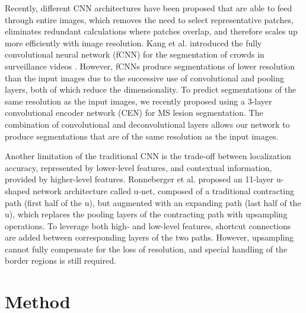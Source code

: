 Recently, different CNN architectures
\citep{ronneberger2015,brosch2015,kang2014} have been proposed that are able
to feed through entire images, which removes the need to select representative
patches, eliminates redundant calculations where patches overlap, and therefore
scales up more efficiently with image resolution. Kang et al. introduced the
fully convolutional neural network (fCNN) for the segmentation of crowds in
surveillance videos \citep{kang2014}. However, fCNNs produce segmentations
of lower resolution than the input images due to the successive use of
convolutional and pooling layers, both of which reduce the dimensionality.
To predict segmentations of the same resolution as the input images, we recently
proposed using a 3-layer convolutional encoder network (CEN) \citep{brosch2015}
for MS lesion segmentation. The combination of convolutional \citep{LeCun1998}
and deconvolutional \citep{zeiler2011} layers allows our network to produce
segmentations that are of the same resolution as the input images. 

Another limitation of the traditional CNN is the trade-off between localization
accuracy, represented by lower-level features, and contextual information,
provided by higher-level features.
%
Ronneberger et al. \citep{ronneberger2015}
%
%
proposed an 11-layer u-shaped network architecture called u-net,
composed of a traditional contracting path (first half of the u), but augmented
with an expanding path (last half of the u), which replaces the pooling layers
of the contracting path with upsampling operations. To leverage both high- and
low-level features, shortcut connections are added between corresponding layers
of the two paths.
However,
upsampling cannot fully compensate for the loss of resolution, and special
handling of the border regions is still required.

\section{Method}

